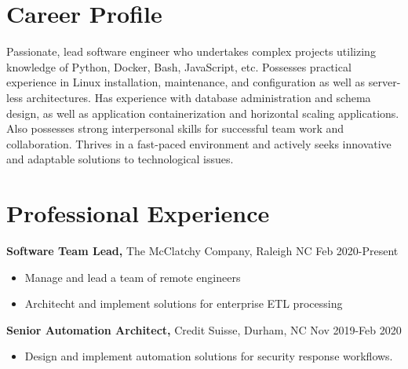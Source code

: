 \documentclass{res}
\begin{document}
 
 
\address{{\bf Present Address} \\ 5973 Dixon Dr. \\ Raleigh, NC 27609  \\
        (336) 681-7224 }
\address{{\bf Permanent Address} \\ 114 East Keeling Rd \\ Greensboro, NC 27410}
 
\begin{resume} 

\noindent\makebox[5.5in]{\rule{6.5in}{0.4pt}}


\section{Career Profile} 
  Passionate, lead software engineer who undertakes complex projects utilizing knowledge of Python, Docker, Bash, JavaScript, etc. Possesses practical experience in Linux installation, maintenance, and configuration as well as server-less architectures. Has experience with database administration and schema design, as well as application containerization and horizontal scaling applications. Also possesses strong interpersonal skills for successful team work and collaboration. Thrives in a fast-paced environment and actively seeks innovative and adaptable solutions to technological issues.
\section{Professional Experience}
  {\bf Software Team Lead,} The McClatchy Company, Raleigh NC \hfill Feb 2020-Present
    \begin{itemize} \itemsep -2pt
      \item Manage and lead a team of remote engineers
      \item Architecht and implement solutions for enterprise ETL processing
    \end{itemize}

  {\bf Senior Automation Architect,} Credit Suisse, Durham, NC \hfill Nov 2019-Feb 2020
    \begin{itemize} \itemsep -2pt
      \item Design and implement automation solutions for security response workflows. 
    \end{itemize}


\end{resume}
\end{document}
